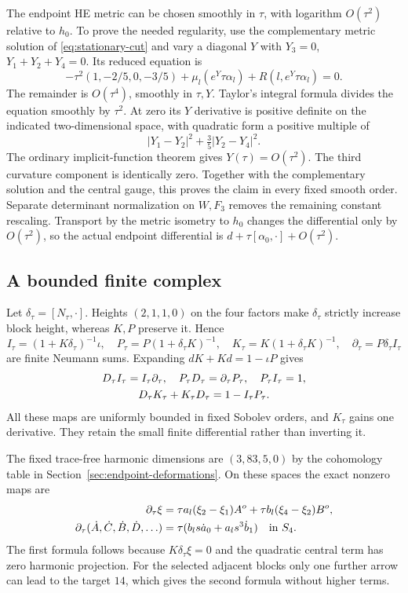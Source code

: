 \documentclass[11pt]{amsart}
\theoremstyle{definition}
\theoremstyle{remark}
\begin{document}
The endpoint HE metric can be chosen smoothly in $\tau$, with logarithm
$O(\tau^2)$ relative to $h_0$. To prove the needed regularity, use the
complementary metric solution of \eqref{eq:stationary-cut} and vary
a diagonal $Y$ with $Y_3=0$, $Y_1+Y_2+Y_4=0$. Its reduced equation is
\[
 -\tau^2(1,-2/5,0,-3/5)
       +\mu_l(e^Y\tau\alpha_l)+R(l,e^Y\tau\alpha_l)=0.
\]
The remainder is $O(\tau^4)$, smoothly in $\tau,Y$. Taylor's integral
formula divides the equation smoothly by $\tau^2$. At zero its
$Y$ derivative is positive definite on the indicated two-dimensional
space, with quadratic form a positive multiple of
\[
 |Y_1-Y_2|^2+\tfrac35|Y_2-Y_4|^2.
\]
The ordinary implicit-function theorem gives $Y(\tau)=O(\tau^2)$.
The third curvature component is identically zero. Together with
the complementary solution and the central gauge, this proves the
claim in every fixed smooth order. Separate determinant normalization
on $W,F_3$ removes the remaining constant rescaling. Transport by
the metric isometry to $h_0$ changes the differential only by
$O(\tau^2)$, so the actual endpoint differential is
$d+\tau[\alpha_0,\cdot]+O(\tau^2)$.

\subsection{A bounded finite complex}
Let $\delta_\tau=[N_\tau,\cdot]$. Heights $(2,1,1,0)$ on the
four factors make $\delta_\tau$ strictly increase block height,
whereas $K,P$ preserve it. Hence
\begin{equation}\label{eq:wall-finite-transfer}
 I_\tau=(1+K\delta_\tau)^{-1}\iota,\quad
 P_\tau=P(1+\delta_\tau K)^{-1},\quad
 K_\tau=K(1+\delta_\tau K)^{-1},\quad
 \partial_\tau=P\delta_\tau I_\tau
\end{equation}
are finite Neumann sums. Expanding $dK+Kd=1-\iota P$ gives
\begin{gather}
 D_\tau I_\tau=I_\tau\partial_\tau,\quad
 P_\tau D_\tau=\partial_\tau P_\tau,\quad P_\tau I_\tau=1,
 \notag\\
 D_\tau K_\tau+K_\tau D_\tau=1-I_\tau P_\tau.
 \label{eq:wall-contraction}
\end{gather}
All these maps are uniformly bounded in fixed Sobolev orders, and
$K_\tau$ gains one derivative. They retain the small finite differential
rather than inverting it.

The fixed trace-free harmonic dimensions are $(3,83,5,0)$ by the
cohomology table in Section~\ref{sec:endpoint-deformations}. On these
spaces the exact nonzero maps are
\begin{align}
 \partial_\tau\xi
 &=\tau a_l(\xi_2-\xi_1)A^o+
                \tau b_l(\xi_4-\xi_2)B^o,\notag\\
 \partial_\tau(\dot A,\dot C,\dot B,\dot D,\ldots)
 &=\tau(b_ls\dot a_0+a_ls^3\dot b_1)
       \quad\hbox{in }S_4.\label{eq:wall-finite-differential}
\end{align}
The first formula follows because $K\delta_\tau\xi=0$ and the
quadratic central term has zero harmonic projection. For the selected
adjacent blocks only one further arrow can lead to the target $14$,
which gives the second formula without higher terms.
\end{document}
